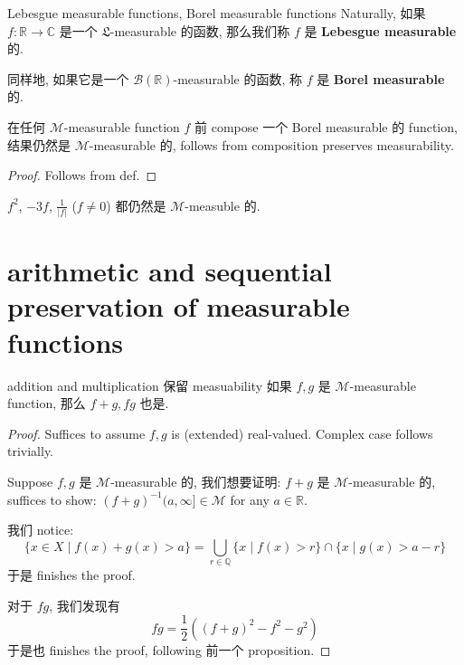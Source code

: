 \documentclass[lang=cn,11pt]{elegantbook}
\begin{document}
\begin{definition}{Lebesgue measurable functions, Borel measurable functions}
Naturally, 如果 $f: \mathbb{R} \rightarrow \mathbb{C}$ 是一个 $\mathfrak{L}$-measurable 的函数, 那么我们称 $f$ 是 \textbf{Lebesgue measurable} 的.

同样地, 如果它是一个 $\mathcal{B}(\mathbb{R})$-measurable 的函数, 称 $f$ 是 \textbf{Borel measurable} 的. 
\end{definition}


\begin{proposition}
    在任何 $\mathcal{M}$-measurable function $f$ 前 compose 一个 Borel measurable 的 function, 结果仍然是 $\mathcal{M}$-measurable 的, follows from composition preserves measurability.
\end{proposition}
\begin{proof}
    Follows from def.
\end{proof}
\begin{example}
    $f^2$, $-3f$, $\frac{1}{|f|}$ ($f\not= 0$) 都仍然是 $\mathcal{M}$-measuble 的.
\end{example}



\section{arithmetic and sequential preservation of measurable functions}
\begin{proposition}{addition and multiplication 保留 measuability}
    如果 $f,g$ 是 $\mathcal{M}$-measurable function, 那么 $f+g, fg$ 也是.
\end{proposition}
\begin{proof}
Suffices to assume $f,g$ is (extended) real-valued. Complex case follows trivially.

Suppose $f,g$ 是 $\mathcal{M}$-measurable 的, 我们想要证明: $f+g$ 是 $\mathcal{M}$-measurable 的, suffices to show: $(f+g)^{-1}(a,\infty] \in \mathcal{M}$ for any $a\in \mathbb{R}$.

我们 notice:
\begin{equation}
    \{x\in X \mid f(x) + g(x) > a  \} = \bigcup_{r \in \mathbb{Q}} \{  x \mid f(x) > r \} \cap \{  x \mid g(x) > a-r \}
\end{equation}
于是 finishes the proof.

对于 $fg$, 我们发现有 
$$
fg = \frac{1}{2}((f+g)^2 - f^2 - g^2)
$$
于是也 finishes the proof, following 前一个 proposition.
\end{proof}
\end{document}
